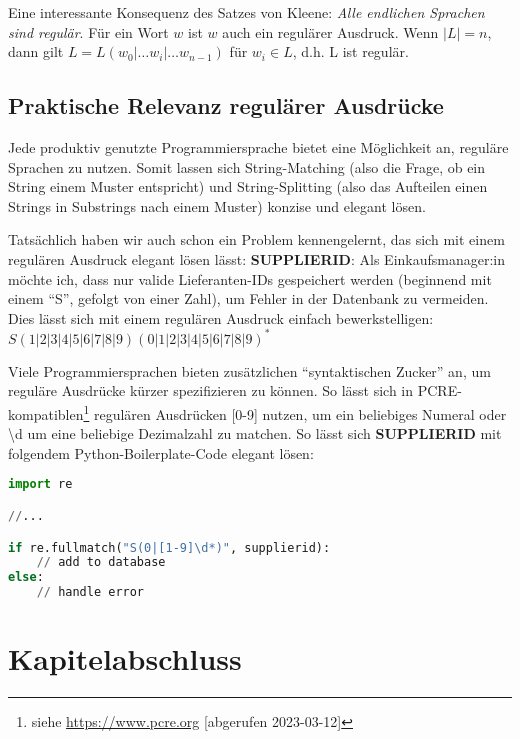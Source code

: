 Eine interessante Konsequenz des Satzes von Kleene:
\emph{Alle endlichen Sprachen sind regulär}.
Für ein Wort $w$ ist $w$ auch ein regulärer Ausdruck.
Wenn $|L| = n$, dann gilt $L = L(w_0|\dots{}w_i|\dots{}w_{n-1})$ für $w_i \in L$, d.h. L ist regulär.

\subsection{Praktische Relevanz regulärer Ausdrücke}

Jede produktiv genutzte Programmiersprache bietet eine Möglichkeit an,
reguläre Sprachen zu nutzen.
Somit lassen sich String-Matching (also die Frage, ob ein String einem Muster entspricht)
und String-Splitting (also das Aufteilen einen Strings in Substrings nach einem Muster)
konzise und elegant lösen.

Tatsächlich haben wir auch schon ein Problem kennengelernt,
das sich mit einem regulären Ausdruck elegant lösen lässt: \textbf{SUPPLIERID}:
Als Einkaufsmanager:in möchte ich,
        dass nur valide Lieferanten-IDs gespeichert werden
        (beginnend mit einem ``S'', gefolgt von einer Zahl),
        um Fehler in der Datenbank zu vermeiden.
Dies lässt sich mit einem regulären Ausdruck einfach bewerkstelligen:
$S(1|2|3|4|5|6|7|8|9)(0|1|2|3|4|5|6|7|8|9)^*$

Viele Programmiersprachen bieten zusätzlichen ``syntaktischen Zucker'' an,
um reguläre Ausdrücke kürzer spezifizieren zu können.
So lässt sich in PCRE-kompatiblen\footnote{
    siehe \href{https://www.pcre.org/}{https://www.pcre.org} [abgerufen 2023-03-12]}
regulären Ausdrücken [0-9] nutzen, um ein beliebiges Numeral 
oder \textbackslash{}d um eine beliebige Dezimalzahl zu matchen.
So lässt sich \textbf{SUPPLIERID} mit folgendem Python-Boilerplate-Code elegant lösen:

\begin{lstlisting}[language=Python, caption=Python-Boilerplate für \textbf{SUPPLIERID}]
import re

//...

if re.fullmatch("S(0|[1-9]\d*)", supplierid):
    // add to database
else:
    // handle error
\end{lstlisting}

\section*{Kapitelabschluss}
